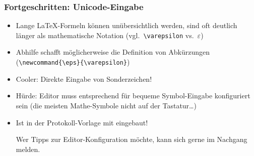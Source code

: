 \begin{frame}[<+->][fragile]
	\frametitle{Fortgeschritten: Unicode-Eingabe}

	\begin{itemize}
		\item Lange \LaTeX-Formeln können unübersichtlich werden, sind oft deutlich länger als mathematische Notation
		(vgl.\ \lstinline|\varepsilon| vs.\ $\varepsilon$)
		\item Abhilfe schafft möglicherweise die Definition von Abkürzungen (\lstinline|\newcommand{\eps}{\varepsilon}|)
		\item Cooler: Direkte Eingabe von Sonderzeichen!
		\renewcommand{\listingsfont}{\FreeMono}
		\lstset{numbers=left, frame=L}
		
		\smallskip
		\item Hürde: Editor muss entsprechend für bequeme Symbol-Eingabe konfiguriert sein (die meisten Mathe-Symbole %
		nicht auf der Tastatur…)
		\item Ist in der Protokoll-Vorlage mit eingebaut!
		
		Wer Tipps zur Editor-Konfiguration möchte, kann sich gerne im Nachgang melden. 
	\end{itemize}
\end{frame}

